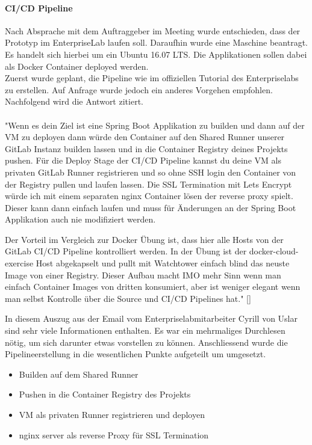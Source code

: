 \paragraph{CI/CD Pipeline}
Nach Absprache mit dem Auftraggeber im Meeting wurde entschieden, dass der Prototyp im EnterpriseLab laufen soll. Daraufhin wurde eine Maschine beantragt. Es handelt sich hierbei um ein Ubuntu 16.07 LTS. Die Applikationen sollen dabei als Docker Container deployed werden. \\
Zuerst wurde geplant, die Pipeline wie im offiziellen Tutorial des Enterpriselabs zu erstellen. Auf Anfrage wurde jedoch ein anderes Vorgehen empfohlen. Nachfolgend wird die Antwort zitiert.  \\\\
"Wenn es dein Ziel ist eine Spring Boot Applikation zu builden und dann auf der VM zu deployen dann würde den Container auf den Shared Runner unserer GitLab Instanz builden lassen und in die Container Registry deines Projekts pushen. Für die Deploy Stage der CI/CD Pipeline kannst du deine VM als privaten GitLab Runner registrieren und so ohne SSH login den Container von der Registry pullen und laufen lassen. Die SSL Termination mit Lets Encrypt würde ich mit einem separaten nginx Container lösen der reverse proxy spielt. Dieser kann dann einfach laufen und muss für Änderungen an der Spring Boot Applikation auch nie modifiziert werden.

Der Vorteil im Vergleich zur Docker Übung ist, dass hier alle Hosts von der GitLab CI/CD Pipeline kontrolliert werden. In der Übung ist der docker-cloud-exercise Host abgekapselt und pullt mit Watchtower einfach blind das neuste Image von einer Registry. Dieser Aufbau macht IMO mehr Sinn wenn man einfach Container Images von dritten konsumiert, aber ist weniger elegant wenn man selbst Kontrolle über die Source und CI/CD Pipelines hat." [\cite{emailEnterpriselab:private}]

In diesem Auszug aus der Email vom Enterpriselabmitarbeiter Cyrill von Uslar sind sehr viele Informationen enthalten. Es war ein mehrmaliges Durchlesen nötig, um sich darunter etwas vorstellen zu können. Anschliessend wurde die Pipelineerstellung in die wesentlichen Punkte aufgeteilt um umgesetzt.
\begin{itemize}
	\item Builden auf dem Shared Runner 
	\item Pushen in die Container Registry des Projekts
	\item VM als privaten Runner registrieren und deployen
	\item nginx server als reverse Proxy für SSL Termination
\end{itemize}

